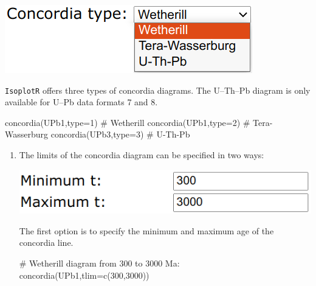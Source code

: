 \begin{refsection}
\noindent\begin{minipage}[t]{.3\linewidth}
  \strut\vspace*{-\baselineskip}\newline
  \includegraphics[width=\linewidth]{../figures/ConcordiaMenu.png}
\end{minipage}
\begin{minipage}[t]{.7\linewidth}
  \texttt{IsoplotR} offers three types of concordia diagrams. The
  U--Th--Pb diagram is only available for U--Pb data formats 7 and 8.
\end{minipage}

\begin{script}
concordia(UPb1,type=1) # Wetherill
concordia(UPb1,type=2) # Tera-Wasserburg
concordia(UPb3,type=3) # U-Th-Pb
\end{script}

\begin{enumerate}

\item The limits of the concordia diagram can be specified in two
  ways:

  \noindent\begin{minipage}[t]{.4\linewidth}
  \strut\vspace*{-\baselineskip}\newline
  \includegraphics[width=\linewidth]{../figures/Concordiatlim.png}
\end{minipage}
\begin{minipage}[t]{.6\linewidth}
  The first option is to specify the minimum and maximum age of the
  concordia line.
\end{minipage}

\begin{script}
# Wetherill diagram from 300 to 3000 Ma:
concordia(UPb1,tlim=c(300,3000)) 
\end{script}


\end{enumerate}
\end{refsection}

